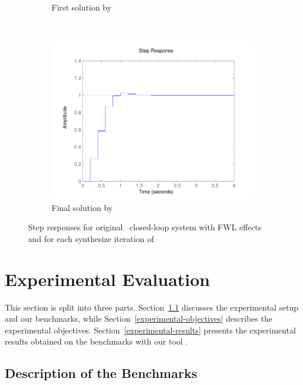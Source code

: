 \documentclass[final]{sig-alternate-05-2015}
\begin{document}
\begin{figure}
\begin{subfigure}[b]{0.3\textwidth}
        \caption{First solution by \tool}
        \label{fig:step1}
    \end{subfigure}
    ~
    \begin{subfigure}[b]{0.3\textwidth}
        \includegraphics[width=\textwidth]{figures/runningexample_step2.pdf}
        \caption{Final solution by \tool}
        \label{fig:step2}
    \end{subfigure}
    \caption{Step responses for original~\cite{DBLP:conf/hybrid/WangGRJF16}
             closed-loop system with FWL effects and for each
             {\sc synthesize} iteration of \tool}\label{fig:step}
\end{figure}

\section{Experimental Evaluation}\label{sec:experiments}

This section is split into three parts. Section~\ref{experimental-setup}
discusses the experimental setup and our benchmarks, while
Section~\ref{experimental-objectives} describes the experimental objectives. 
Section~\ref{experimental-results} presents the experimental results
obtained on the benchmarks with our tool \tool.

\subsection{Description of the Benchmarks}
\label{experimental-setup}
\end{document}
